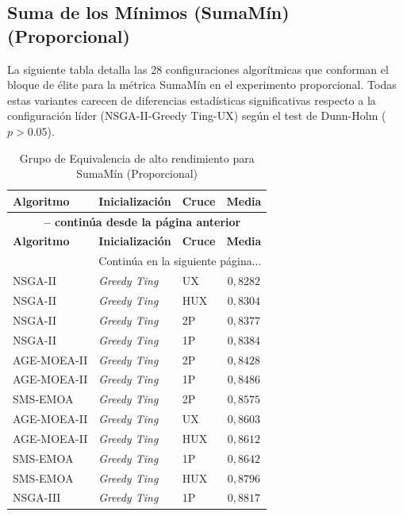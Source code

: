 \subsection{Suma de los Mínimos (SumaMín) (Proporcional)}\label{anexo:elite_summin_prop}

La siguiente tabla detalla las 28 configuraciones algorítmicas que conforman el bloque de élite para la métrica SumaMín en el experimento proporcional. Todas estas variantes carecen de diferencias estadísticas significativas respecto a la configuración líder (NSGA-II-Greedy Ting-UX) según el test de Dunn-Holm ($p > 0.05$).

\begin{longtable}{lllc}
    \caption{Grupo de Equivalencia de alto rendimiento para SumaMín (Proporcional)}
    \label{tab:elite_summin_prop} \\
    \toprule
    \textbf{Algoritmo} & \textbf{Inicialización} & \textbf{Cruce} & \textbf{Media} \\
    \midrule
    \endfirsthead
    \multicolumn{4}{c}{{\bfseries \tablename\ \thetable{} -- continúa desde la página anterior}} \\
    \toprule
    \textbf{Algoritmo} & \textbf{Inicialización} & \textbf{Cruce} & \textbf{Media} \\
    \midrule
    \endhead
    \midrule \multicolumn{4}{r}{{Continúa en la siguiente página...}} \\
    \endfoot
    \bottomrule
    \endlastfoot
    NSGA-II & \textit{Greedy Ting} & UX & $0{,}8282$ \\
NSGA-II & \textit{Greedy Ting} & HUX & $0{,}8304$ \\
NSGA-II & \textit{Greedy Ting} & 2P & $0{,}8377$ \\
NSGA-II & \textit{Greedy Ting} & 1P & $0{,}8384$ \\
AGE-MOEA-II & \textit{Greedy Ting} & 2P & $0{,}8428$ \\
AGE-MOEA-II & \textit{Greedy Ting} & 1P & $0{,}8486$ \\
SMS-EMOA & \textit{Greedy Ting} & 2P & $0{,}8575$ \\
AGE-MOEA-II & \textit{Greedy Ting} & UX & $0{,}8603$ \\
AGE-MOEA-II & \textit{Greedy Ting} & HUX & $0{,}8612$ \\
SMS-EMOA & \textit{Greedy Ting} & 1P & $0{,}8642$ \\
SMS-EMOA & \textit{Greedy Ting} & HUX & $0{,}8796$ \\
NSGA-III & \textit{Greedy Ting} & 1P & $0{,}8817$ \\

\end{longtable}
